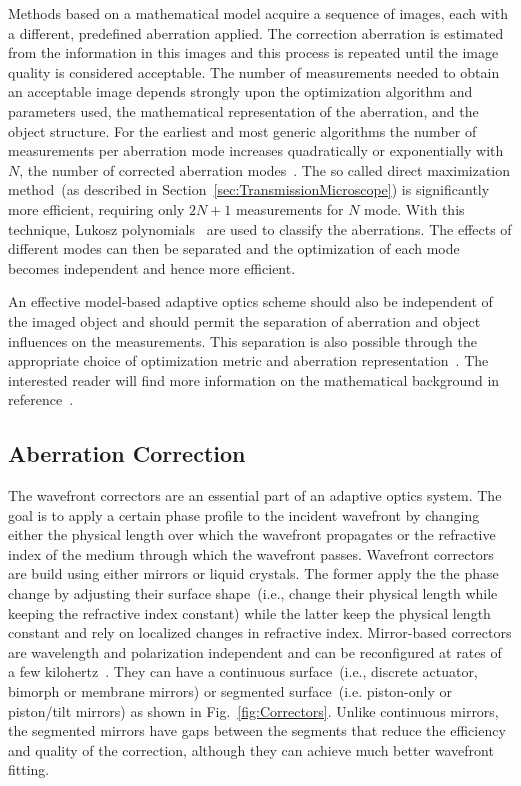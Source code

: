 Methods based on a mathematical model acquire a sequence of images, each with a different, predefined aberration applied. The correction aberration is estimated from the information in this images and this process is repeated until the image quality is considered acceptable. The number of measurements needed to obtain an acceptable image depends strongly upon the optimization algorithm and parameters used, the mathematical representation of the aberration, and the object structure. For the earliest and most generic algorithms the number of measurements per aberration mode increases quadratically or exponentially with $N$, the number of corrected aberration modes~\cite{wide_sphere_packing}. The so called direct maximization method~(as described in Section~\ref{sec:TransmissionMicroscope}) is significantly more efficient, requiring only $2N+1$ measurements for $N$ mode. With this technique, Lukosz polynomials~\cite{wide_Lukosz_Modes} are used to classify the aberrations. The effects of different modes can then be separated and the optimization of each mode becomes independent and hence more efficient.

An effective model-based adaptive optics scheme should also be independent of the imaged object and should permit the separation of aberration and object influences on the measurements. This separation is also possible through the appropriate choice of optimization metric and aberration representation~\cite{wide_AOM_loew_freq}. The interested reader will find more information on the mathematical background in reference~\cite{wide_parabolic_optimization,wide_sphere_packing,wide_Lukosz_Modes,wide_AOM_loew_freq}. 


\subsection{Aberration Correction}
\label{sec:AberrationCorrection}

The wavefront correctors are an essential part of an adaptive optics system. The goal is to apply a certain phase profile to the incident wavefront by changing either the physical length over which the wavefront propagates or the refractive index of the medium through which the wavefront passes. Wavefront correctors are build using either mirrors or liquid crystals. The former apply the the phase change by adjusting their surface shape~(i.e., change their physical length while keeping the refractive index constant) while the latter keep the physical length constant and rely on localized changes in refractive index.  Mirror-based correctors are wavelength and polarization independent and can be reconfigured at rates of a few kilohertz~\cite{AOM_basic_ref}. They can have a continuous surface~(i.e., discrete actuator, bimorph or membrane mirrors) or segmented surface~(i.e. piston-only or piston/tilt mirrors) as shown in Fig.~\ref{fig:Correctors}. Unlike continuous mirrors, the segmented mirrors have gaps between the segments that reduce the efficiency and quality of the correction, although they can achieve much better wavefront fitting. 

